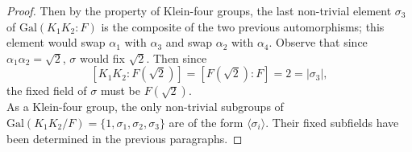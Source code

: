 \documentclass{article}
\begin{document}
\begin{enumerate}[label={(\alph*)}]
\begin{proof}
        Then by the property of Klein-four groups, the last non-trivial
        element $\sigma_3$ of $\text{Gal}(K_1K_2:F)$ is the composite of the
        two previous automorphisms; this element would swap $\alpha_1$ with
        $\alpha_3$ and swap $\alpha_2$ with $\alpha_4$. Observe that since
        $\alpha_1\alpha_2=\sqrt{2}$, $\sigma$ would fix
        $\sqrt{2}$. Then since
        \[[K_1K_2:F(\sqrt{2})]=[F(\sqrt{2}):F]=2=|\sigma_3|,\]
        the fixed field of $\sigma$ must be $F(\sqrt{2})$. \\

        As a Klein-four group, the only non-trivial subgroups of
        $\text{Gal}(K_1K_2/F)=\{1,\sigma_1,\sigma_2,\sigma_3\}$ are of the
        form $\langle\sigma_i\rangle$. Their fixed subfields have been
        determined in the previous paragraphs. 
      \end{proof}
  \end{enumerate}
\end{document}
